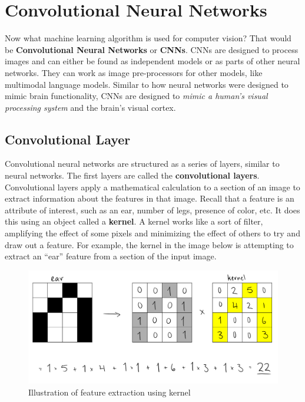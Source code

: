 \section{Convolutional Neural Networks}
\begin{flushleft}
    \large Now what machine learning algorithm is used for computer vision? That would be \textbf{Convolutional Neural Networks} or \textbf{CNNs}. CNNs are designed to process images and can either be found as independent models or as parts of other neural networks. They can work as image pre-processors for other models, like multimodal language models. Similar to how neural networks were designed to mimic brain functionality, CNNs are designed to \textit{mimic a human's visual processing system} and the brain's visual cortex. 

    \subsection{Convolutional Layer}
        Convolutional neural networks are structured as a series of layers, similar to neural networks. The first layers are called the \textbf{convolutional layers}. Convolutional layers apply a mathematical calculation to a section of an image to extract information about the features in that image. Recall that a feature is an attribute of interest, such as an ear, number of legs, presence of color, etc. It does this using an object called a \textbf{kernel}. A kernel works like a sort of filter, amplifying the effect of some pixels and minimizing the effect of others to try and draw out a feature. For example, the kernel in the image below is attempting to extract an ``ear'' feature from a section of the input image. 
        \begin{figure}[H]
            \centering
            \includegraphics[width=1\linewidth]{cv/kernelextraction.png}
            \caption{Illustration of feature extraction using kernel}
            \label{fig:kernelextraction}
        \end{figure}


\end{flushleft}
